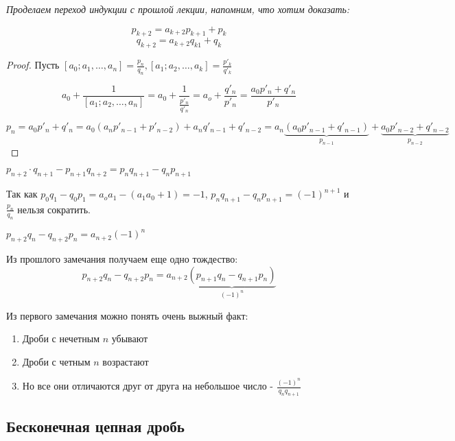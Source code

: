 
\textit{Проделаем переход индукции с прошлой лекции, напомним, что хотим доказать:}

\begin{theorem}
    $$p_{k + 2} = a_{k + 2} p_{k + 1} + p_k$$
    $$q_{k + 2} = a_{k + 2} q_{k 1} + q_k$$
\end{theorem}

\begin{proof}
    Пусть $[a_0; a_1,\dots, a_n] = \frac{p_n}{q_n}, [a_1; a_2, \dots, a_k] = \frac{p'_k}{q'_k}$

    $$a_0 + \frac{1}{[a_1; a_2, \dots, a_n]} = a_0 + \frac{1}{\frac{p'_n}{q'_n}} = a_o + \frac{q'_n}{p'_n} = \frac{a_0 p'_n + q'_n}{p'_n}$$

    $$p_n = a_0 p'_n + q'_n = a_0 (a_n p'_{n - 1} + p'_{n - 2}) + a_n q'_{n - 1 } + q'_{n - 2} = a_n \underbrace{(a_0 p'_{n - 1} + q'_{n    - 1}) }_{p_{n-1}}+ \underbrace{a_0 p'_{n - 2} + q'_{n - 2}}_{p_{n-2}}$$
\end{proof}

\begin{note}
$p_{n + 2} \cdot q_{n + 1} - p_{n + 1} q_{n + 2} = p_n q_{n + 1} - q_{n}p_{n + 1}$

Так как $p_0 q_1 - q_0 p_1 = a_o a_1 - (a_1 a_0 + 1) = -1$, $p_n q_{n + 1} - q_n p_{n + 1} = (-1)^{n + 1}$ и $\frac{p_n}{q_n}$ нельзя сократить.
\end{note}

\begin{note} $p_{n + 2}q_n - q_{n + 2}p_n = a_{n + 2} (-1)^n$

Из прошлого замечания получаем еще одно тождество:
$$p_{n + 2}q_n - q_{n + 2}p_n = a_{n + 2}\underbrace{(p_{n + 1}q_n - q_{n + 1}p_n)}_{(-1)^n}$$
\end{note}

\begin{proposition}
    Из первого замечания можно понять очень выжный факт:
    \begin{enumerate}
        \item Дроби с нечетным $n$ убывают
        \item Дроби с четным $n$ возрастают
        \item Но все они отличаются друг от друга на небольшое число - $\frac{(-1)^n}{q_n q_{n + 1}}$
    \end{enumerate}
\end{proposition}

\subsection{Бесконечная цепная дробь}

